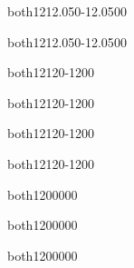 \begin{WordParagraph}{both}{12}{}{12.05}{0}{-12.05}{0}{0}
\WordAutoSpaceOn
{}%
\end{WordParagraph}

\begin{WordParagraph}{both}{12}{}{12.05}{0}{-12.05}{0}{0}
\WordAutoSpaceOn
{}%
\end{WordParagraph}

\begin{WordParagraph}{both}{12}{}{12}{0}{-12}{0}{0}
\WordAutoSpaceOn
\WordEmpty
\end{WordParagraph}

\begin{WordParagraph}{both}{12}{}{12}{0}{-12}{0}{0}
\WordAutoSpaceOn
\WordEmpty
\end{WordParagraph}

\begin{WordParagraph}{both}{12}{}{12}{0}{-12}{0}{0}
\WordAutoSpaceOn
\WordEmpty
\end{WordParagraph}

\begin{WordParagraph}{both}{12}{}{12}{0}{-12}{0}{0}
\WordAutoSpaceOn
\WordEmpty
\end{WordParagraph}

\begin{WordParagraph}{both}{12}{}{0}{0}{0}{0}{0}
\WordAutoSpaceOn
\WordEmpty
\end{WordParagraph}

\begin{WordParagraph}{both}{12}{}{0}{0}{0}{0}{0}
\WordAutoSpaceOn
\WordEmpty
\end{WordParagraph}

\begin{WordParagraph}{both}{12}{}{0}{0}{0}{0}{0}
\WordAutoSpaceOn
\WordEmpty
\end{WordParagraph}

